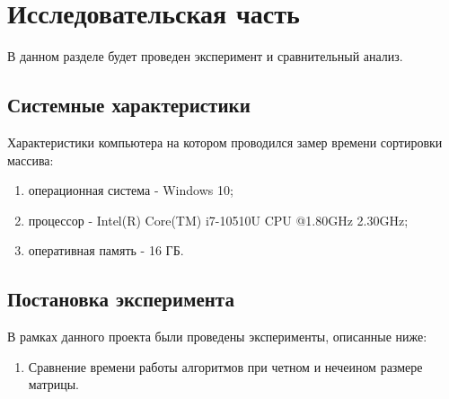 \documentclass[a4paper, 12pt]{article}
\begin{document}
\section{Исследовательская часть }
\begin{flushleft}
	\hspace*{5mm} В данном разделе будет проведен эксперимент и сравнительный анализ.
	\subsection{Системные характеристики}
	Характеристики компьютера на котором проводился замер времени сортировки массива:
	\begin{enumerate}
		\item операционная система - Windows 10;
		\item процессор - Intel(R) Core(TM) i7-10510U CPU @1.80GHz 2.30GHz;
		\item оперативная память - 16 ГБ.
	\end{enumerate}
	\subsection{Постановка эксперимента}
	В рамках данного проекта были проведены эксперименты, описанные ниже:
	\begin{enumerate}
		\item Сравнение времени работы алгоритмов при четном и нечеином размере матрицы.
	\end{enumerate}

\end{flushleft}
\end{document}
